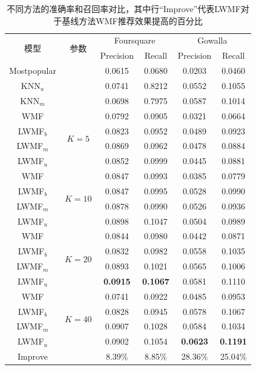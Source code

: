 \begin{table}
  \centering
  \caption{不同方法的准确率和召回率对比，其中行``Improve''代表LWMF对于基线方法WMF推荐效果提高的百分比}
    \begin{tabular}{|c|c|c|c|c|c|}
    \hline
    \multirow{2}[4]{*}{模型} & \multicolumn{1}{c|}{\multirow{2}[4]{*}{参数}} & \multicolumn{2}{c|}{Foursquare} & \multicolumn{2}{c|}{Gowalla} \bigstrut\\
\cline{3-6}          &       & Precision & Recall & Precision & Recall \bigstrut\\
\hline
  Mostpopular &       & 0.0615 & 0.0680 & 0.0203 & 0.0460 \bigstrut\\
    KNN$_u$  &       & 0.0741 & 0.8212 & 0.0552 & 0.1055 \bigstrut\\
    KNN$_m$  &       & 0.0698 & 0.7975 & 0.0587 & 0.1014 \bigstrut\\
        \hline
    WMF   & \multicolumn{1}{c|}{\multirow{4}[0]{*}{$K=5$}} & 0.0792 & 0.0905 & 0.0321 & 0.0664 \bigstrut\\
    LWMF$_b$ &       & 0.0823 & 0.0952 & 0.0489 & 0.0923 \bigstrut\\
    LWMF$_m$ &       & 0.0869 & 0.0962 & 0.0478 & 0.0884 \bigstrut\\
    LWMF$_u$ &       & 0.0852 & 0.0999 & 0.0445 & 0.0881\bigstrut \\
        \hline
    WMF   & \multicolumn{1}{c|}{\multirow{4}[0]{*}{$K=10$}} & 0.0847 & 0.0993 & 0.0385 & 0.0779 \bigstrut\\
    LWMF$_b$ &       & 0.0847 & 0.0995 & 0.0528 & 0.0990 \bigstrut\\
    LWMF$_m$ &       & 0.0878 & 0.0990 & 0.0526 & 0.0936 \bigstrut\\
    LWMF$_u$ &       & 0.0898 & 0.1047 & 0.0504 & 0.0989 \bigstrut\\
        \hline
    WMF   & \multicolumn{1}{c|}{\multirow{4}[0]{*}{$K=20$}} & 0.0844 & 0.0980 & 0.0442 & 0.0871 \bigstrut\\
    LWMF$_b$ &       & 0.0832 & 0.0982 & 0.0558 & 0.1035 \bigstrut\\
    LWMF$_m$ &       & 0.0893 & 0.1021 & 0.0565 & 0.1006 \bigstrut\\
    LWMF$_u$ &       & \textbf{0.0915} & \textbf{0.1067} & 0.0581 & 0.1110 \bigstrut\\
        \hline
    WMF   & \multicolumn{1}{c|}{\multirow{4}[0]{*}{$K=40$}} & 0.0741 & 0.0922 & 0.0485 & 0.0953 \bigstrut\\
    
    LWMF$_b$ &       & 0.0828 & 0.0945 & 0.0578 & 0.1067 \bigstrut\\
    LWMF$_m$ &       & 0.0907 & 0.1028 & 0.0584 & 0.1034 \bigstrut\\
    LWMF$_u$ &       & 0.0902 & 0.1054 & \textbf{0.0623} & \textbf{0.1191} \bigstrut\\
        \hline
     Improve & & 8.39\% & 8.85\% & 28.36\% & 25.04\% \bigstrut\\
    \hline
    \end{tabular}%
  \label{tab-lwmf-foursquare}%
\end{table}%


